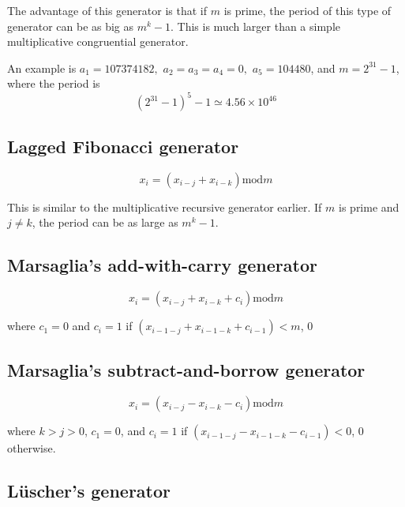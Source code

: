 \documentclass[justified, sixbynine]{tufte-book}
\theoremstyle{plain}%
\newtheorem * {corollary}{Corollary}
\theoremstyle{definition}
\theoremstyle{remark}
\newtheorem * {remark}{Remark}
\newtheorem * {note}{Note}
\begin{document}
\begin{fullwidth}
The advantage of this generator is that if $m$ is prime, the period of this
type of generator can be as big as $m^k-1$. This is much larger than a
simple multiplicative congruential generator.

An example is $a_1=107374182, $ $a_2=a_3=a_4=0, $ $a_5=104480$, and $m=2^{31}-1$,
where the period is
\begin{equation}
(2^{31}-1)^5-1\simeq 4.56\times 10^{46}
\end{equation}

\goodbreak\subsection{Lagged Fibonacci generator}

\begin{equation}
x_i=(x_{i-j}+x_{i-k})\textrm{mod}m
\end{equation}

This is similar to the multiplicative recursive generator earlier. If $m$ is
prime and $j\neq k$, the period can be as large as $m^k-1$.

\goodbreak\subsection{Marsaglia's add-with-carry generator}

\begin{equation}
x_i=(x_{i-j}+x_{i-k}+c_i)\textrm{mod}m
\end{equation}

where $c_1=0$ and $c_i=1$ if $(x_{i-1-j}+x_{i-1-k}+c_{i-1})<m$, $0$

\goodbreak\subsection{Marsaglia's subtract-and-borrow generator}

\begin{equation}
x_i=(x_{i-j}-x_{i-k}-c_i)\textrm{mod}m
\end{equation}

where $k>j>0$, $c_1=0$, and $c_i=1$ if $(x_{i-1-j}-x_{i-1-k}-c_{i-1})<0$, $0$
otherwise.

\goodbreak\subsection{L\"uscher's generator}


\end{fullwidth}
\end{document}
